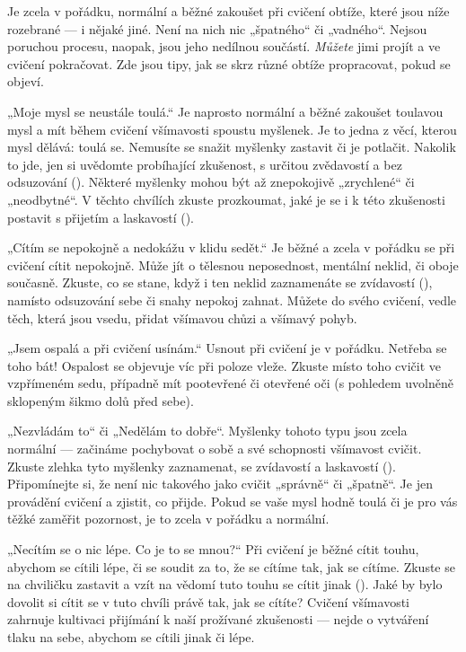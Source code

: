 	{
	Je zcela v pořádku, normální a běžné zakoušet při cvičení obtíže, které jsou níže rozebrané — i nějaké jiné. Není na nich nic „špatného“ či „vadného“. Nejsou poruchou procesu, naopak, jsou jeho nedílnou součástí. \emph{Můžete} jimi projít a ve cvičení pokračovat. Zde jsou tipy, jak se skrz různé obtíže propracovat, pokud se objeví.
	\begin{description*}
		\item[„Moje mysl se neustále toulá.“] Je naprosto normální a běžné zakoušet toulavou mysl a mít během cvičení všímavosti spoustu myšlenek. Je to jedna z věcí, kterou mysl dělává: toulá se. Nemusíte se snažit myšlenky zastavit či je potlačit. Nakolik to jde, jen si uvědomte probíhající zkušenost, s určitou zvědavostí a bez odsuzování (). Některé myšlenky mohou být až znepokojivě „zrychlené“ či „neodbytné“. V těchto chvílích zkuste prozkoumat, jaké je se i k této zkušenosti postavit s přijetím a laskavostí ().
		\item[„Cítím se nepokojně a nedokážu v klidu sedět.“] Je běžné a zcela v pořádku se při cvičení cítit nepokojně. Může jít o tělesnou neposednost, mentální neklid, či oboje současně. Zkuste, co se stane, když i ten neklid zaznamenáte se zvídavostí (), namísto odsuzování sebe či snahy nepokoj zahnat. Můžete do svého cvičení, vedle těch, která jsou vsedu, přidat všímavou chůzi a všímavý pohyb.
		\item[„Jsem ospalá a při cvičení usínám.“] Usnout při cvičení je v pořádku. Netřeba se toho bát! Ospalost se objevuje víc při poloze vleže. Zkuste místo toho cvičit ve vzpřímeném sedu, případně mít pootevřené či otevřené oči (s pohledem uvolněně sklopeným šikmo dolů před sebe).
		\item[„Nezvládám to“ či „Nedělám to dobře“.] Myšlenky tohoto typu jsou zcela normální — začináme pochybovat o sobě a své schopnosti všímavost cvičit. Zkuste zlehka tyto myšlenky zaznamenat, se zvídavostí a laskavostí (). Připomínejte si, že není nic takového jako cvičit „správně“ či „špatně“. Je jen provádění cvičení a zjistit, co přijde. Pokud se vaše mysl hodně toulá či je pro vás těžké zaměřit pozornost, je to zcela v pořádku a normální.
		\item[„Necítím se o nic lépe. Co je to se mnou?“] Při cvičení je běžné cítit touhu, abychom se cítili lépe, či se soudit za to, že se cítíme tak, jak se cítíme. Zkuste se na chviličku zastavit a vzít na vědomí tuto touhu se cítit jinak (). Jaké by bylo dovolit si cítit se v tuto chvíli právě tak, jak se cítíte? Cvičení všímavosti zahrnuje kultivaci přijímání k naší prožívané zkušenosti — nejde o vytváření tlaku na sebe, abychom se cítili jinak či lépe.

\end{description*}}
